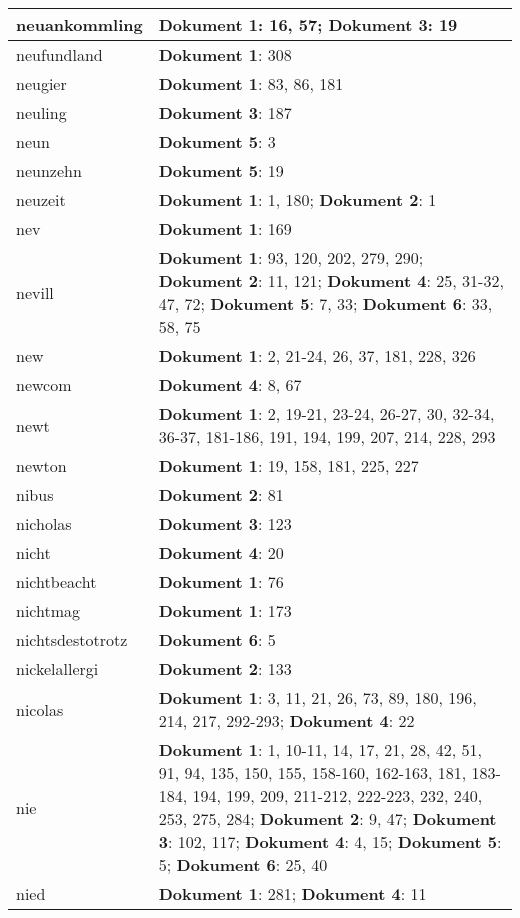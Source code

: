\documentclass[a5paper]{article}
\begin{document}
\begin{longtable}[l]{|l|p{3in}|}
\hline
neuankommling & \textbf{Dokument 1}: 16, 57; \textbf{Dokument 3}: 19 \\
\hline
neufundland & \textbf{Dokument 1}: 308 \\
\hline
neugier & \textbf{Dokument 1}: 83, 86, 181 \\
\hline
neuling & \textbf{Dokument 3}: 187 \\
\hline
neun & \textbf{Dokument 5}: 3 \\
\hline
neunzehn & \textbf{Dokument 5}: 19 \\
\hline
neuzeit & \textbf{Dokument 1}: 1, 180; \textbf{Dokument 2}: 1 \\
\hline
nev & \textbf{Dokument 1}: 169 \\
\hline
nevill & \textbf{Dokument 1}: 93, 120, 202, 279, 290; \textbf{Dokument 2}: 11, 121; \textbf{Dokument 4}: 25, 31-32, 47, 72; \textbf{Dokument 5}: 7, 33; \textbf{Dokument 6}: 33, 58, 75 \\
\hline
new & \textbf{Dokument 1}: 2, 21-24, 26, 37, 181, 228, 326 \\
\hline
newcom & \textbf{Dokument 4}: 8, 67 \\
\hline
newt & \textbf{Dokument 1}: 2, 19-21, 23-24, 26-27, 30, 32-34, 36-37, 181-186, 191, 194, 199, 207, 214, 228, 293 \\
\hline
newton & \textbf{Dokument 1}: 19, 158, 181, 225, 227 \\
\hline
nibus & \textbf{Dokument 2}: 81 \\
\hline
nicholas & \textbf{Dokument 3}: 123 \\
\hline
nicht & \textbf{Dokument 4}: 20 \\
\hline
nichtbeacht & \textbf{Dokument 1}: 76 \\
\hline
nichtmag & \textbf{Dokument 1}: 173 \\
\hline
nichtsdestotrotz & \textbf{Dokument 6}: 5 \\
\hline
nickelallergi & \textbf{Dokument 2}: 133 \\
\hline
nicolas & \textbf{Dokument 1}: 3, 11, 21, 26, 73, 89, 180, 196, 214, 217, 292-293; \textbf{Dokument 4}: 22 \\
\hline
nie & \textbf{Dokument 1}: 1, 10-11, 14, 17, 21, 28, 42, 51, 91, 94, 135, 150, 155, 158-160, 162-163, 181, 183-184, 194, 199, 209, 211-212, 222-223, 232, 240, 253, 275, 284; \textbf{Dokument 2}: 9, 47; \textbf{Dokument 3}: 102, 117; \textbf{Dokument 4}: 4, 15; \textbf{Dokument 5}: 5; \textbf{Dokument 6}: 25, 40 \\
\hline
nied & \textbf{Dokument 1}: 281; \textbf{Dokument 4}: 11 \\

\end{longtable}
\end{document}
